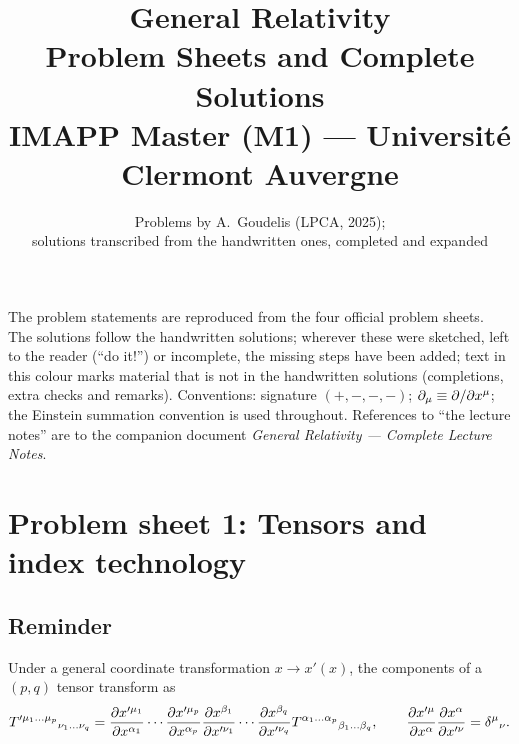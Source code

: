 \documentclass[11pt,a4paper]{article}
\title{\Huge\bfseries General Relativity\\[0.4em]
\Large Problem Sheets and Complete Solutions\\[1em]
\large IMAPP Master (M1) --- Université Clermont Auvergne}
\author{Problems by A.~Goudelis (LPCA, 2025);\\ solutions transcribed from the handwritten ones, completed and expanded}
\date{}
\numberwithin{equation}{subsection}
\begin{document}
\maketitle
\thispagestyle{empty}

\noindent The problem statements are reproduced from the four official problem sheets. The solutions follow the handwritten solutions; wherever these were sketched, left to the reader (``do it!'') or incomplete, the missing steps have been added; \textcolor{teal!60!black}{text in this colour marks material that is not in the handwritten solutions (completions, extra checks and remarks)}. Conventions: signature $(+,-,-,-)$; $\partial_\mu\equiv\partial/\partial x^\mu$; the Einstein summation convention is used throughout. References to ``the lecture notes'' are to the companion document \emph{General Relativity --- Complete Lecture Notes}.

\tableofcontents
\newpage

\section{Problem sheet 1: Tensors and index technology}

\subsection*{Reminder}
Under a general coordinate transformation $x\to x'(x)$, the components of a $(p,q)$ tensor transform as
\[
  T'^{\mu_1\dots\mu_p}{}_{\nu_1\dots\nu_q}=\frac{\partial x'^{\mu_1}}{\partial x^{\alpha_1}}\cdots\frac{\partial x'^{\mu_p}}{\partial x^{\alpha_p}}\frac{\partial x^{\beta_1}}{\partial x'^{\nu_1}}\cdots\frac{\partial x^{\beta_q}}{\partial x'^{\nu_q}}T^{\alpha_1\dots\alpha_p}{}_{\beta_1\dots\beta_q},
  \qquad\frac{\partial x'^\mu}{\partial x^\alpha}\frac{\partial x^\alpha}{\partial x'^\nu}=\delta^\mu{}_\nu .
\]
\end{document}
